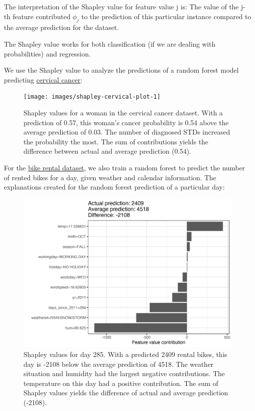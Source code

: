 \documentclass[
  12pt,
]{krantz}
\begin{document}
The interpretation of the Shapley value for feature value j is:
The value of the j-th feature contributed \(\phi_j\) to the prediction of this particular instance compared to the average prediction for the dataset.

The Shapley value works for both classification (if we are dealing with probabilities) and regression.

We use the Shapley value to analyze the predictions of a random forest model predicting \protect\hyperlink{cervical}{cervical cancer}:

\begin{figure}

{\centering \texttt{[image: images/shapley-cervical-plot-1]} 

}

\caption{Shapley values for a woman in the cervical cancer dataset. With a prediction of 0.57, this woman's cancer probability is 0.54 above the average prediction of 0.03. The number of diagnosed STDs increased the probability the most. The sum of contributions yields the difference between actual and average prediction (0.54).}\label{fig:shapley-cervical-plot}
\end{figure}

For the \protect\hyperlink{bike-data}{bike rental dataset}, we also train a random forest to predict the number of rented bikes for a day, given weather and calendar information.
The explanations created for the random forest prediction of a particular day:

\begin{figure}

{\centering \includegraphics[width=\textwidth]{images/shapley-bike-plot-1} 

}

\caption{Shapley values for day 285. With a predicted 2409 rental bikes, this day is -2108 below the average prediction of 4518. The weather situation and humidity had the largest negative contributions. The temperature on this day had a positive contribution. The sum of Shapley values yields the difference of actual and average prediction (-2108).}\label{fig:shapley-bike-plot}
\end{figure}
\end{document}
